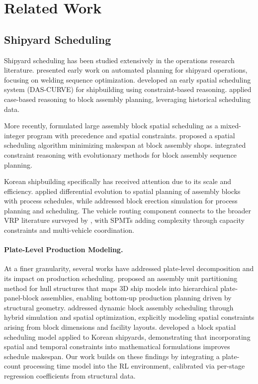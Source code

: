 \documentclass[11pt,a4paper]{article}
\begin{document}
\section{Related Work}
\label{sec:related_work}

\subsection{Shipyard Scheduling}

Shipyard scheduling has been studied extensively in the operations research literature. \citet{cho1999automated} presented early work on automated planning for shipyard operations, focusing on welding sequence optimization. \citet{lee1996spatial} developed an early spatial scheduling system (DAS-CURVE) for shipbuilding using constraint-based reasoning. \citet{seo2007block} applied case-based reasoning to block assembly planning, leveraging historical scheduling data.

More recently, \citet{kwon2016spatial} formulated large assembly block spatial scheduling as a mixed-integer program with precedence and spatial constraints. \citet{zheng2011spatial} proposed a spatial scheduling algorithm minimizing makespan at block assembly shops. \citet{qu2013integrated} integrated constraint reasoning with evolutionary methods for block assembly sequence planning.

Korean shipbuilding specifically has received attention due to its scale and efficiency. \citet{shin2008heuristic} applied differential evolution to spatial planning of assembly blocks with process schedules, while \citet{roh2007generation} addressed block erection simulation for process planning and scheduling. The vehicle routing component connects to the broader VRP literature surveyed by \citet{toth2014vehicle}, with SPMTs adding complexity through capacity constraints and multi-vehicle coordination.

\paragraph{Plate-Level Production Modeling.} At a finer granularity, several works have addressed plate-level decomposition and its impact on production scheduling. \citet{zhong2013assembly} proposed an assembly unit partitioning method for hull structures that maps 3D ship models into hierarchical plate-panel-block assemblies, enabling bottom-up production planning driven by structural geometry. \citet{liu2012scheduling} addressed dynamic block assembly scheduling through hybrid simulation and spatial optimization, explicitly modeling spatial constraints arising from block dimensions and facility layouts. \citet{lee2012block} developed a block spatial scheduling model applied to Korean shipyards, demonstrating that incorporating spatial and temporal constraints into mathematical formulations improves schedule makespan. Our work builds on these findings by integrating a plate-count processing time model into the RL environment, calibrated via per-stage regression coefficients from structural data.
\end{document}
